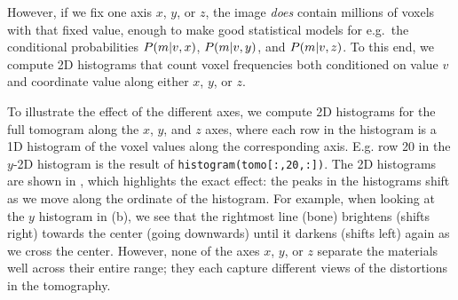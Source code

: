 However, if we fix one axis $x$, $y$, or $z$, the image \textit{does} contain
millions of voxels with that fixed value, enough to make good statistical
models for e.g.~the conditional probabilities $P\!\left(m\middle\vert v,x\right)$, $P\!\left(m\middle\vert v,y\right)$,
and $P\!\left(m\middle\vert v,z\right)$. To this end, we compute 2D histograms that count voxel
frequencies both conditioned on value $v$ and coordinate value along either
$x$, $y$, or $z$.

To illustrate the effect of the different axes, we compute 2D histograms for
the full tomogram along the $x$, $y$, and $z$ axes, where each row in the
histogram is a 1D histogram of the voxel values along the corresponding axis.
E.g. row 20 in the $y$-2D histogram is the result of
\texttt{histogram(tomo[:,20,:])}. The 2D histograms are shown in
, which highlights the exact effect: the peaks in the
histograms shift as we move along the ordinate of the histogram. For example,
when looking at the $y$ histogram in (b), we see that the
rightmost line (bone) brightens (shifts right) towards the center (going
downwards) until it darkens (shifts left) again as we cross the center.
However, none of the axes $x$, $y$, or $z$ separate the materials well across
their entire range; they each capture different views of the distortions in the
tomography.

